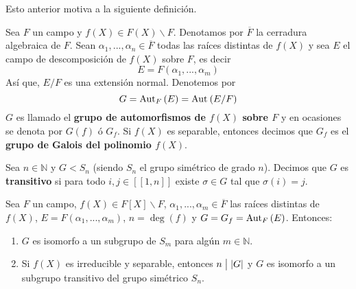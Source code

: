 \documentclass[12pt]{report}
\theoremstyle{largebreak}
\newcommand\abs[1]{\ensuremath{\left|#1\right|}}
\newcommand\divides{\ensuremath{\bigm|}}
\newcommand\natint[1]{\ensuremath{\left[\!\left[ #1\right]\!\right]}}
\begin{document}
    Esto anterior motiva a la siguiente definición.

    \begin{mydef}
        Sea $F$ un campo y $f(X)\in F(X)\backslash F$. Denotamos por $\overline{F}$ la cerradura algebraica de $F$. Sean $\alpha_1,...,\alpha_n\in\overline{F}$ todas las raíces distintas de $f(X)$ y sea $E$ el campo de descomposición de $f(X)$ sobre $F$, es decir
        \begin{equation*}
            E=F(\alpha_1,...,\alpha_m)
        \end{equation*}
        Así que, $E/F$ es una extensión normal. Denotemos por
        \begin{equation*}
            G=\textup{Aut}_{F}\left(E\right)=\textup{Aut}_{}\left(E/F\right)
        \end{equation*}
        $G$ es llamado el \textbf{grupo de automorfismos de $f(X)$ sobre $F$} y en ocasiones se denota por $G(f)$ ó $G_f$. Si $f(X)$ es separable, entonces decimos que $G_f$ es el \textbf{grupo de Galois del polinomio $f(X)$}.
    \end{mydef}

    \begin{mydef}
        Sea $n\in\mathbb{N}$ y $G<S_n$ (siendo $S_n$ el grupo simétrico de grado $n$). Decimos que $G$ es \textbf{transitivo} si para todo $i,j\in\natint{1,n}$ existe $\sigma\in G$ tal que $\sigma(i)=j$.
    \end{mydef}

    \begin{theor}
        Sea $F$ un campo, $f(X)\in F[X]\backslash F$, $\alpha_1,...,\alpha_m\in\overline{F}$ las raíces distintas de $f(X)$, $E=F(\alpha_1,...,\alpha_m)$, $n=\deg(f)$ y $G=G_f=\textup{Aut}_{F}\left(E\right)$. Entonces:
        \begin{enumerate}
            \item $G$ es isomorfo a un subgrupo de $S_m$ para algún $m\in\mathbb{N}$.
            \item Si $f(X)$ es irreducible y separable, entonces $n\divides\abs{G}$ y $G$ es isomorfo a un subgrupo transitivo del grupo simétrico $S_n$.
        \end{enumerate}
    \end{theor}
\end{document}
